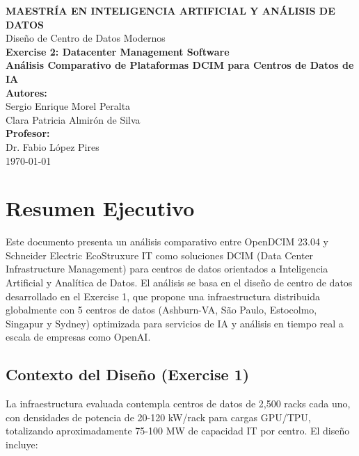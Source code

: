 \documentclass[12pt,a4paper]{article}
\begin{document}
\begin{titlepage}
\centering
\vspace*{2cm}

{\LARGE\textbf{MAESTRÍA EN INTELIGENCIA ARTIFICIAL Y ANÁLISIS DE DATOS}}\\[0.5cm]
{\Large Diseño de Centro de Datos Modernos}\\[2cm]

{\Huge\textbf{Exercise 2: Datacenter Management Software}}\\[0.5cm]
{\Large\textbf{Análisis Comparativo de Plataformas DCIM para Centros de Datos de IA}}\\[3cm]

{\Large\textbf{Autores:}}\\[0.5cm]
{\large Sergio Enrique Morel Peralta}\\
{\large Clara Patricia Almirón de Silva}\\[2cm]

{\Large\textbf{Profesor:}}\\[0.5cm]
{\large Dr. Fabio López Pires}\\[3cm]

{\large\today}

\vfill
\end{titlepage}

\tableofcontents
\newpage

\section{Resumen Ejecutivo}

Este documento presenta un análisis comparativo entre OpenDCIM 23.04 y Schneider Electric EcoStruxure IT como soluciones DCIM (Data Center Infrastructure Management) para centros de datos orientados a Inteligencia Artificial y Analítica de Datos. El análisis se basa en el diseño de centro de datos desarrollado en el Exercise 1, que propone una infraestructura distribuida globalmente con 5 centros de datos (Ashburn-VA, São Paulo, Estocolmo, Singapur y Sydney) optimizada para servicios de IA y análisis en tiempo real a escala de empresas como OpenAI.

\subsection{Contexto del Diseño (Exercise 1)}

La infraestructura evaluada contempla centros de datos de 2,500 racks cada uno, con densidades de potencia de 20-120 kW/rack para cargas GPU/TPU, totalizando aproximadamente 75-100 MW de capacidad IT por centro. El diseño incluye:
\end{document}
